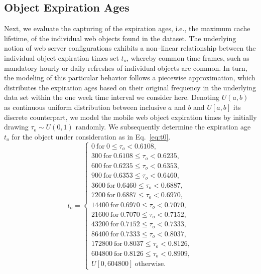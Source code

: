 \documentclass[letterpaper,conference]{IEEEtran}
\begin{document}
\subsection{Object Expiration Ages}
Next, we evaluate the capturing of the expiration ages, i.e., the maximum cache lifetime, of the individual web objects found in the dataset.
The underlying notion of web server configurations exhibits a non--linear relationship between the individual object expiration times set $t_o$, whereby common time frames, such as mandatory hourly or daily refreshes of individual objects are common. 
In turn, the modeling of this particular behavior follows a piecewise approximation, which distributes the expiration ages based on their original frequency in the underlying data set within the one week time interval we consider here.
Denoting $U(a,b)$ as continuous uniform distribution between inclusive $a$ and $b$ and $U[a,b]$ its discrete counterpart, we model the mobile web object expiration times by initially drawing $\tau_o \sim U(0,1)$ randomly.
We subsequently determine the expiration age $t_o$ for the object under consideration as in Eq.~\ref{eq:t0}.
\begin{equation}\label{eq:t0}
t_o =
\begin{cases}
0 ~\mathrm{for}~ 0 \le \tau_o <  0.6108,\\
300 ~\mathrm{for}~ 0.6108 \le  \tau_o < 0.6235,\\
600 ~\mathrm{for}~ 0.6235 \le \tau_o < 0.6353,\\
900 ~\mathrm{for}~ 0.6353 \le \tau_o < 0.6460,\\
3600 ~\mathrm{for}~0.6460 \le \tau_o < 0.6887,\\
7200 ~\mathrm{for}~0.6887 \le \tau_o < 0.6970,\\
14400 ~\mathrm{for}~0.6970 \le \tau_o < 0.7070,\\
21600 ~\mathrm{for}~0.7070 \le \tau_o < 0.7152,\\
43200 ~\mathrm{for}~0.7152 \le \tau_o < 0.7333,\\
86400 ~\mathrm{for}~0.7333 \le \tau_o < 0.8037,\\
172800 ~\mathrm{for}~0.8037 \le \tau_o < 0.8126,\\
604800 ~\mathrm{for}~0.8126 \le \tau_o < 0.8909,\\
U[0, 604800]~\mathrm{otherwise}.
\end{cases}
\end{equation}
\end{document}
